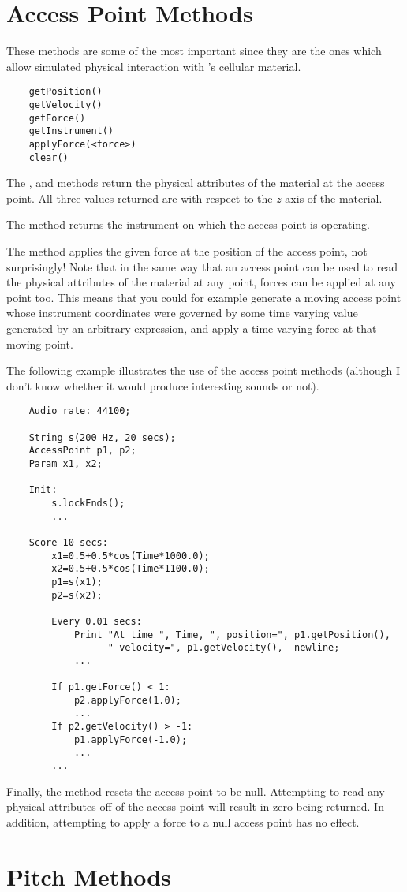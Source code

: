 \section{Access Point Methods}
These methods are some of the most important since they are the
ones which allow simulated physical interaction with \tao's
cellular material.

\begin{verbatim}
    getPosition()
    getVelocity()
    getForce()
    getInstrument()
    applyForce(<force>)
    clear()   
\end{verbatim}

The ,  and 
methods return the physical attributes of the material at the access point.
All three values returned are with respect to the $z$ axis of the material.

The  method returns the instrument on which the
access point is operating. 

The  method applies the given force at the position
of the access point, not surprisingly! Note that in the same way that an
access point can be used to read the physical attributes of the material at
any point, forces can be applied at any point too. This means that you
could for example generate a moving access point whose instrument coordinates
were governed by some time varying value generated by an arbitrary expression,
and apply a time varying force at that moving point. 

The following example illustrates the use of the access point methods 
(although I don't know whether it would produce interesting sounds or not).

\begin{verbatim}
    Audio rate: 44100;
    
    String s(200 Hz, 20 secs);
    AccessPoint p1, p2;
    Param x1, x2;
    
    Init:
        s.lockEnds();
        ...
    
    Score 10 secs:
        x1=0.5+0.5*cos(Time*1000.0);
        x2=0.5+0.5*cos(Time*1100.0);
        p1=s(x1);
        p2=s(x2);
        
        Every 0.01 secs:
            Print "At time ", Time, ", position=", p1.getPosition(), 
                  " velocity=", p1.getVelocity(),  newline;
            ...
    
        If p1.getForce() < 1:
            p2.applyForce(1.0);
            ...
        If p2.getVelocity() > -1:
            p1.applyForce(-1.0);
            ...
        ...
\end{verbatim}

Finally, the  method resets the access point to
be null. Attempting to read any physical attributes off of the
access point will result in zero being returned. In addition,
attempting to apply a force to a null access point has no effect.

\section{Pitch Methods}















